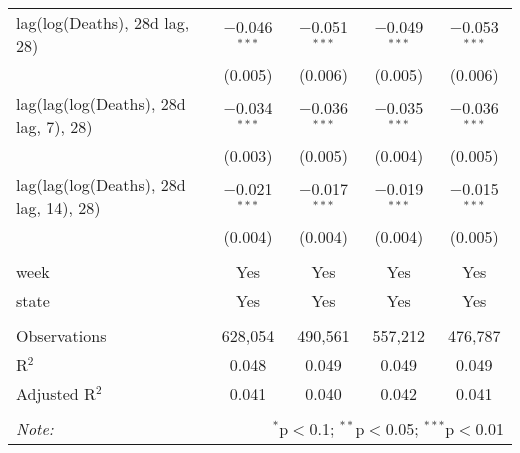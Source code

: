 \begin{tabular}{@{\extracolsep{1pt}}lcccc}
  lag(log(Deaths), 28d lag, 28) & $-$0.046$^{***}$ & $-$0.051$^{***}$ & $-$0.049$^{***}$ & $-$0.053$^{***}$ \\ 
  & (0.005) & (0.006) & (0.005) & (0.006) \\ 
  lag(lag(log(Deaths), 28d lag, 7), 28) & $-$0.034$^{***}$ & $-$0.036$^{***}$ & $-$0.035$^{***}$ & $-$0.036$^{***}$ \\ 
  & (0.003) & (0.005) & (0.004) & (0.005) \\ 
  lag(lag(log(Deaths), 28d lag, 14), 28) & $-$0.021$^{***}$ & $-$0.017$^{***}$ & $-$0.019$^{***}$ & $-$0.015$^{***}$ \\ 
  & (0.004) & (0.004) & (0.004) & (0.005) \\ 
 \hline \\[-1.8ex] 
week & Yes & Yes & Yes & Yes \\ 
state & Yes & Yes & Yes & Yes \\ 
\hline \\[-1.8ex] 
Observations & 628,054 & 490,561 & 557,212 & 476,787 \\ 
R$^{2}$ & 0.048 & 0.049 & 0.049 & 0.049 \\ 
Adjusted R$^{2}$ & 0.041 & 0.040 & 0.042 & 0.041 \\ 
\hline 
\hline \\[-1.8ex] 
\textit{Note:}  & \multicolumn{4}{r}{$^{*}$p$<$0.1; $^{**}$p$<$0.05; $^{***}$p$<$0.01} \\ 
\end{tabular} 